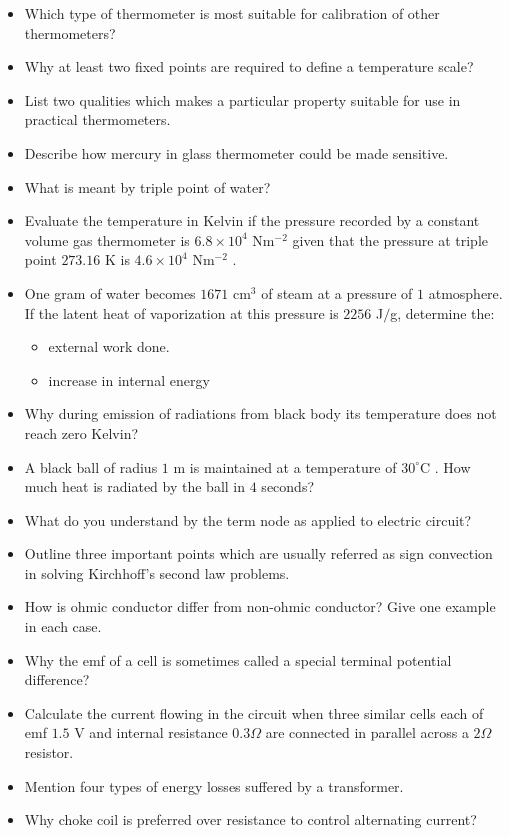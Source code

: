 \documentclass{article}
\begin{document}
\begin{itemize}
\item Which type of thermometer is most suitable for calibration of other thermometers? 
\item Why at least two fixed points are required to define a temperature scale?
\item List two qualities which makes a particular property suitable for use in practical thermometers. 
\item Describe how mercury in glass thermometer could be made sensitive.
\item What is meant by triple point of water? 
\item Evaluate the temperature in Kelvin if the pressure recorded by a constant volume gas thermometer is $ 6.8 \times 10^{4}$ Nm$ ^{-2}$ given that the pressure at triple point $ 273.16$ K is $ 4.6 \times 10^{4}$ Nm$ ^{-2}$ .
\item One gram of water becomes $ 1671 $ cm$ ^{3}$ of steam at a pressure of $ 1$ atmosphere. If the latent heat of vaporization at this pressure is $ 2256$ J$/$g, determine the:
 \begin{itemize}
\item external work done. 
\item increase in internal energy 
\end{itemize}
\item Why during emission of radiations from black body its temperature does not  reach zero Kelvin? 
\item A black ball of radius $ 1$ m is maintained at a temperature of $ 30^{\circ}$C . How much  heat is radiated by the ball in $ 4$ seconds? 
\item What do you understand by the term node as applied to electric circuit?
\item Outline three important points which are usually referred as sign convection in  solving Kirchhoff’s second law problems. 
\item How is ohmic conductor differ from non-ohmic conductor? Give one example in each case. 
\item Why the emf of a cell is sometimes called a special terminal potential difference? 
\item Calculate the current flowing in the circuit when three similar cells each of emf $ 1.5$ V and internal resistance $ 0.3\Omega $ are connected in parallel across a $ 2\Omega $ resistor. 
\item Mention four types of energy losses suffered by a transformer.  
\item Why choke coil is preferred over resistance to control alternating current?

\end{itemize}
\end{document}
